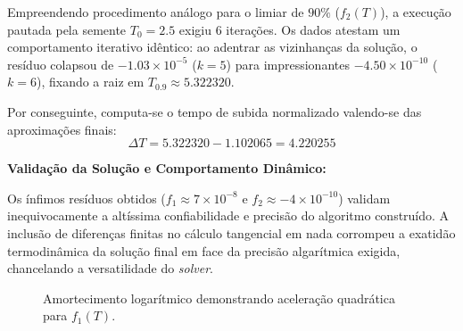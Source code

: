 Empreendendo procedimento análogo para o limiar de $90\%$ ($f_2(T)$), a execução pautada pela semente $T_0 = 2.5$ exigiu 6 iterações. Os dados atestam um comportamento iterativo idêntico: ao adentrar as vizinhanças da solução, o resíduo colapsou de $-1.03 \times 10^{-5}$ ($k=5$) para impressionantes $-4.50 \times 10^{-10}$ ($k=6$), fixando a raiz em $T_{0.9} \approx 5.322320$.

Por conseguinte, computa-se o tempo de subida normalizado valendo-se das aproximações finais:
\begin{equation}
    \Delta T = 5.322320 - 1.102065 = 4.220255
\end{equation}

\textbf{Validação da Solução e Comportamento Dinâmico:}

Os ínfimos resíduos obtidos ($f_1 \approx 7 \times 10^{-8}$ e $f_2 \approx -4 \times 10^{-10}$) validam inequivocamente a altíssima confiabilidade e precisão do algoritmo construído. A inclusão de diferenças finitas no cálculo tangencial em nada corrompeu a exatidão termodinâmica da solução final em face da precisão algarítmica exigida, chancelando a versatilidade do \textit{solver}.

\begin{figure}[H]
    \centering
    \caption{Amortecimento logarítmico demonstrando aceleração quadrática para $f_1(T)$.}
    \label{fig:convergencia_newton_amplificador}
\end{figure}

